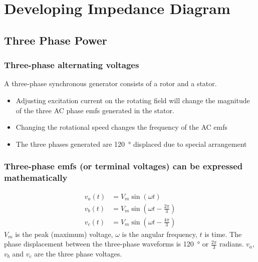 \documentclass[class=report, crop=false, 12pt,a4paper]{standalone}
\begin{document}
\chapter{Developing Impedance Diagram}
\section{Three Phase Power}
\subsection{Three-phase alternating voltages}
A three-phase synchronous generator consists of a rotor and a stator.
\begin{itemize}
	\item Adjusting excitation current on the rotating field will change the magnitude of the three AC phase emfs generated in the stator.
	\item Changing the rotational speed changes the frequency of the AC emfs
	\item The three phases generated are \SI{120}{\degree} displaced due to special arrangement
\end{itemize}
\subsection{Three-phase emfs (or terminal voltages) can be expressed mathematically}
\begin{align}
	v_a\left( t\right) & = V_m \sin\left( \omega t\right)                  \\
	v_b\left( t\right) & = V_m \sin\left( \omega t - \frac{2\pi}{3}\right) \\
	v_c\left( t\right) & = V_m \sin\left( \omega t - \frac{4\pi}{3}\right)
\end{align}
$V_m$ is the peak (maximum) voltage, $\omega$ is the angular frequency, $t$ is time. The phase displacement between the three-phase waveforms is \SI{120}{\degree} or $\frac{2\pi}{3}$ radians. $v_a$, $v_b$ and $v_c$ are the three phase voltages.
\end{document}
